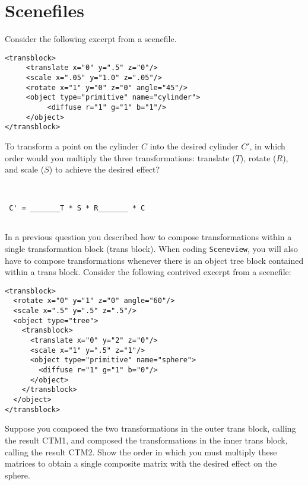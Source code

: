 \documentclass[10pt,twocolumn]{article}
\begin{document}
\section{Scenefiles}
Consider the following excerpt from a scenefile.
\begin{verbatim}
<transblock>
     <translate x="0" y=".5" z="0"/>
     <scale x=".05" y="1.0" z=".05"/>
     <rotate x="1" y="0" z="0" angle="45"/>
     <object type="primitive" name="cylinder">
          <diffuse r="1" g="1" b="1"/> 
     </object>
</transblock>
\end{verbatim}

\begin{framed}
  To transform a point on the cylinder $C$ into the desired cylinder $C'$, in which order would you multiply the three transformations: translate ($T$), rotate ($R$), and scale ($S$) to achieve the desired effect?
\begin{verbatim}


 C' = _______T * S * R_______ * C
 
\end{verbatim} 
\end{framed}

\noindent In a previous question you described how to compose transformations within a single transformation block (trans block). When coding {\tt Sceneview}, you will also have to compose transformations whenever there is an object tree block contained within a trans block. Consider the following contrived excerpt from a scenefile:
\begin{verbatim}
<transblock>
  <rotate x="0" y="1" z="0" angle="60"/> 
  <scale x=".5" y=".5" z=".5"/>
  <object type="tree">
    <transblock>
      <translate x="0" y="2" z="0"/>
      <scale x="1" y=".5" z="1"/>
      <object type="primitive" name="sphere">
        <diffuse r="1" g="1" b="0"/> 
      </object>
    </transblock> 
  </object>
</transblock>
\end{verbatim}

\begin{framed}
  Suppose you composed the two transformations in the outer trans block, calling the result CTM1, and composed the transformations in the inner trans block, calling the result CTM2. Show the order in which you must multiply these matrices to obtain a single composite matrix with the desired effect on the sphere.
\end{framed}
\end{document}
